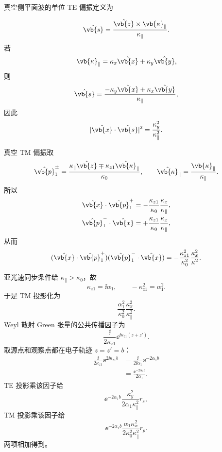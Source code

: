 \begin{derivation}
真空侧平面波的单位 TE 偏振定义为

\[
\hat{\vb{s}}
=\frac{\hat{\vb{z}}\times\vb{\kappa}_\parallel}{\kappa_\parallel}.
\]
若
\[
\vb{\kappa}_\parallel=\kappa_x\hat{\vb{x}}+\kappa_y\hat{\vb{y}},
\]
则
\[
\hat{\vb{s}}
=\frac{-\kappa_y\hat{\vb{x}}+\kappa_x\hat{\vb{y}}}{\kappa_\parallel},
\]
因此
\[
|\hat{\vb{x}}\cdot\hat{\vb{s}}|^2
=\frac{\kappa_y^2}{\kappa_\parallel^2}.
\]

真空 TM 偏振取
\[
\hat{\vb{p}}_1^\pm
=\frac{\kappa_\parallel\hat{\vb{z}}
\mp \kappa_{z1}\hat{\vb{\kappa}}_\parallel}{\kappa_0},
\qquad
\hat{\vb{\kappa}}_\parallel
=\frac{\vb{\kappa}_\parallel}{\kappa_\parallel}.
\]
所以
\begin{align*}
\hat{\vb{x}}\cdot\hat{\vb{p}}_1^+
&=-\frac{\kappa_{z1}}{\kappa_0}\frac{\kappa_x}{\kappa_\parallel},\\
\hat{\vb{p}}_1^-\cdot\hat{\vb{x}}
&=+\frac{\kappa_{z1}}{\kappa_0}\frac{\kappa_x}{\kappa_\parallel},
\end{align*}
从而
\[
(\hat{\vb{x}}\cdot\hat{\vb{p}}_1^+)
(\hat{\vb{p}}_1^-\cdot\hat{\vb{x}})
=-\frac{\kappa_{z1}^2}{\kappa_0^2}
\frac{\kappa_x^2}{\kappa_\parallel^2}.
\]
亚光速同步条件给 $\kappa_\parallel>\kappa_0$，故
\[
\kappa_{z1}=\ii\alpha_1,
\qquad
-\kappa_{z1}^2=\alpha_1^2.
\]
于是 TM 投影化为
\[
\frac{\alpha_1^2}{\kappa_0^2}
\frac{\kappa_x^2}{\kappa_\parallel^2}.
\]
Weyl 散射 Green 张量的公共传播因子为
\[
\frac{\ii}{2\kappa_{z1}}
\ee^{\ii \kappa_{z1}(z+z')}.
\]
取源点和观察点都在电子轨迹 $z=z'=b$：
\begin{align*}
\frac{\ii}{2\kappa_{z1}}\ee^{2\ii \kappa_{z1}b}
&=\frac{\ii}{2\ii\alpha_1}\ee^{-2\alpha_1 b}\\
&=\frac{\ee^{-2\alpha_1 b}}{2\alpha_1}.
\end{align*}
TE 投影乘该因子给
\[
\ee^{-2\alpha_1 b}\frac{\kappa_y^2}{2\alpha_1 \kappa_\parallel^2}r_s,
\]
TM 投影乘该因子给
\[
\ee^{-2\alpha_1 b}
\frac{\alpha_1 \kappa_x^2}{2\kappa_0^2\kappa_\parallel^2}r_p.
\]
两项相加得到。
\end{derivation}

